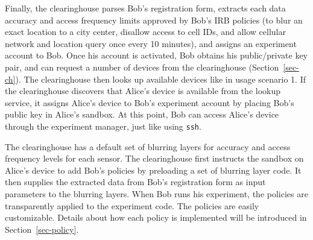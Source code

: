 {{Finally, the clearinghouse
parses Bob's registration form, extracts each data accuracy and access 
frequency limits approved by Bob's IRB policies (to blur an exact location 
to a city center, disallow access to cell IDs, and allow cellular network and 
location query once every 10 minutes), and assigns an experiment 
account to Bob. Once his account is activated, 
Bob obtains his public/private key pair, and can request a number of devices from the 
clearinghouse (Section~\ref{sec-ch}). The clearinghouse then looks up
available devices like in usage scenario 1. If the clearinghouse 
discovers that Alice's device is available from the lookup service, it
assigns Alice's device to Bob's experiment account by placing Bob's
public key in Alice's sandbox. At this point, Bob can access Alice's 
device through the experiment manager, just like using \texttt{ssh}.

The clearinghouse has a default set of blurring layers 
for accuracy and access frequency levels for each sensor. 
The clearinghouse first instructs 
the sandbox on Alice's device to add Bob's policies by preloading
a set of blurring layer code. It then supplies the extracted data from 
Bob's registration form as input parameters to the blurring layers. 
When Bob runs his experiment, the policies are transparently applied
to the experiment code. 
The policies are easily customizable. Details about
how each policy is implemented will be introduced in Section~\ref{sec-policy}.

%

}}
